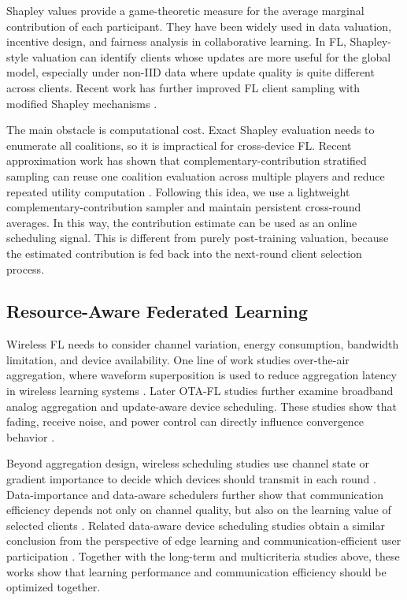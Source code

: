 \documentclass[journal]{IEEEtran}
\begin{document}
Shapley values provide a game-theoretic measure for the average marginal contribution of each participant. They have been widely used in data valuation, incentive design, and fairness analysis in collaborative learning. In FL, Shapley-style valuation can identify clients whose updates are more useful for the global model, especially under non-IID data where update quality is quite different across clients. Recent work has further improved FL client sampling with modified Shapley mechanisms \cite{wu2026fedmsv}.

The main obstacle is computational cost. Exact Shapley evaluation needs to enumerate all coalitions, so it is impractical for cross-device FL. Recent approximation work has shown that complementary-contribution stratified sampling can reuse one coalition evaluation across multiple players and reduce repeated utility computation \cite{sun2024complementary}. Following this idea, we use a lightweight complementary-contribution sampler and maintain persistent cross-round averages. In this way, the contribution estimate can be used as an online scheduling signal. This is different from purely post-training valuation, because the estimated contribution is fed back into the next-round client selection process.

\subsection{Resource-Aware Federated Learning}

Wireless FL needs to consider channel variation, energy consumption, bandwidth limitation, and device availability. One line of work studies over-the-air aggregation, where waveform superposition is used to reduce aggregation latency in wireless learning systems \cite{yang2020otafl,amiri2020machine}. Later OTA-FL studies further examine broadband analog aggregation and update-aware device scheduling. These studies show that fading, receive noise, and power control can directly influence convergence behavior \cite{zhu2020broadband,amiri2021updateaware}.

Beyond aggregation design, wireless scheduling studies use channel state or gradient importance to decide which devices should transmit in each round \cite{ren2020scheduling,du2023gradient}. Data-importance and data-aware schedulers further show that communication efficiency depends not only on channel quality, but also on the learning value of selected clients \cite{su2022datachannel}. Related data-aware device scheduling studies obtain a similar conclusion from the perspective of edge learning and communication-efficient user participation \cite{liu2021data,taik2022data}. Together with the long-term and multicriteria studies above, these works show that learning performance and communication efficiency should be optimized together.
\end{document}
